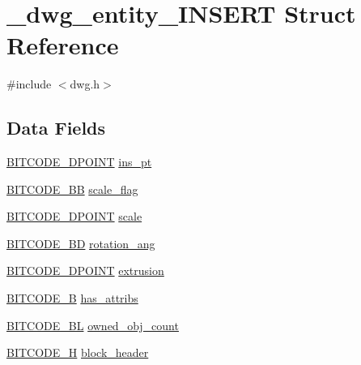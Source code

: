 \hypertarget{struct__dwg__entity__INSERT}{\section{\-\_\-dwg\-\_\-entity\-\_\-\-I\-N\-S\-E\-R\-T \-Struct \-Reference}
\label{struct__dwg__entity__INSERT}
}


{\ttfamily \#include $<$dwg.\-h$>$}

\subsection*{\-Data \-Fields}
\begin{DoxyCompactItemize}
\item 
\hyperlink{dwg_8h_a28caf4c2afeb01c45b68490ea6d81113}{\-B\-I\-T\-C\-O\-D\-E\-\_\-D\-P\-O\-I\-N\-T} \hyperlink{struct__dwg__entity__INSERT_adad2ce50d9787ac9453b1ed62348ba98}{ins\-\_\-pt}
\item 
\hyperlink{dwg_8h_a3d492df0a5def6aa68636113e209241f}{\-B\-I\-T\-C\-O\-D\-E\-\_\-\-B\-B} \hyperlink{struct__dwg__entity__INSERT_adc3f07ae9c5c89c9160b711530b1a136}{scale\-\_\-flag}
\item 
\hyperlink{dwg_8h_a28caf4c2afeb01c45b68490ea6d81113}{\-B\-I\-T\-C\-O\-D\-E\-\_\-D\-P\-O\-I\-N\-T} \hyperlink{struct__dwg__entity__INSERT_ac19a1f7f67cca70c31a3db0517176bbf}{scale}
\item 
\hyperlink{dwg_8h_a3c1e6781466b74ba07785d57da70ed97}{\-B\-I\-T\-C\-O\-D\-E\-\_\-\-B\-D} \hyperlink{struct__dwg__entity__INSERT_af79d40d7165f06886f1c74bb40c5635a}{rotation\-\_\-ang}
\item 
\hyperlink{dwg_8h_a28caf4c2afeb01c45b68490ea6d81113}{\-B\-I\-T\-C\-O\-D\-E\-\_\-D\-P\-O\-I\-N\-T} \hyperlink{struct__dwg__entity__INSERT_aba80c8b09ae9fec8d63002339ed1423b}{extrusion}
\item 
\hyperlink{dwg_8h_ab533b1f62d9086749e3bb5b67e9f224e}{\-B\-I\-T\-C\-O\-D\-E\-\_\-\-B} \hyperlink{struct__dwg__entity__INSERT_a9a30440907cb63799e5f41a75168a5e6}{has\-\_\-attribs}
\item 
\hyperlink{dwg_8h_aebd5f127038868cbabc3d55d91da776c}{\-B\-I\-T\-C\-O\-D\-E\-\_\-\-B\-L} \hyperlink{struct__dwg__entity__INSERT_a810331074e4397dbfdf02600e4c78d7c}{owned\-\_\-obj\-\_\-count}
\item 
\hyperlink{dwg_8h_a7c700e94e047a97ba8c24bdfe4029dc3}{\-B\-I\-T\-C\-O\-D\-E\-\_\-\-H} \hyperlink{struct__dwg__entity__INSERT_aad5fc107c57f33601f5b17616b3c9bbd}{block\-\_\-header}

\end{DoxyCompactItemize}
